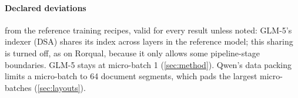 \paragraph{Declared deviations} from the reference training recipes, valid for every result unless noted:
GLM-5's indexer (DSA) shares its index across layers in the reference model; this sharing is turned off, as on Rorqual, because it only allows some pipeline-stage boundaries. GLM-5 stays at micro-batch 1 (\cref{sec:method}). Qwen's data packing limits a micro-batch to 64 document segments, which pads the largest micro-batches (\cref{sec:layouts}).
